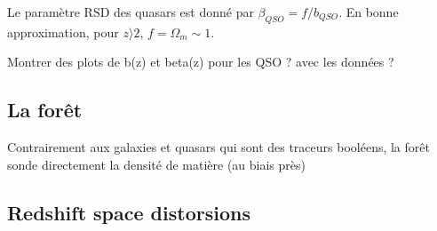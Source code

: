 \documentclass[11pt, twoside, a4paper, openright]{report}
\begin{document}
Le paramètre RSD des quasars est donné par $\beta_{QSO} = f / b_{QSO}$. En bonne approximation, pour $z \rangle 2$, $f = \Omega_m \sim 1$.

Montrer des plots de b(z) et beta(z) pour les QSO ? avec les données ?




\subsection{La forêt \lya{}}
Contrairement aux galaxies et quasars qui sont des traceurs booléens, la forêt \lya{} sonde directement la densité de matière (au biais près)


\subsection{Redshift space distorsions}
\end{document}
